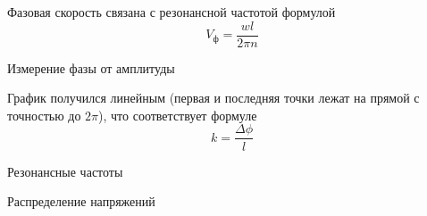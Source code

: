 Фазовая скорость связана с резонансной частотой формулой
\[
    V_{\text{ф}} = \frac{wl}{2 \pi n}
\]

\begin{figure}[ht!]
\end{figure}
\begin{table}[!ht]
    \centering
    \caption{Измерение фазы от амплитуды}
    
\end{table}
График получился линейным (первая и последняя точки лежат на прямой с точностью до $2\pi$), что
соответствует формуле
\[
    k=\frac{\Delta\phi}{l}
\]

\begin{table}[!ht]
    \centering
    \caption{Резонансные частоты}
    
\end{table}

\begin{table}[!ht]
    \centering
    \caption{Распределение напряжений}
    
\end{table}
\begin{figure}[ht!]
\end{figure}

